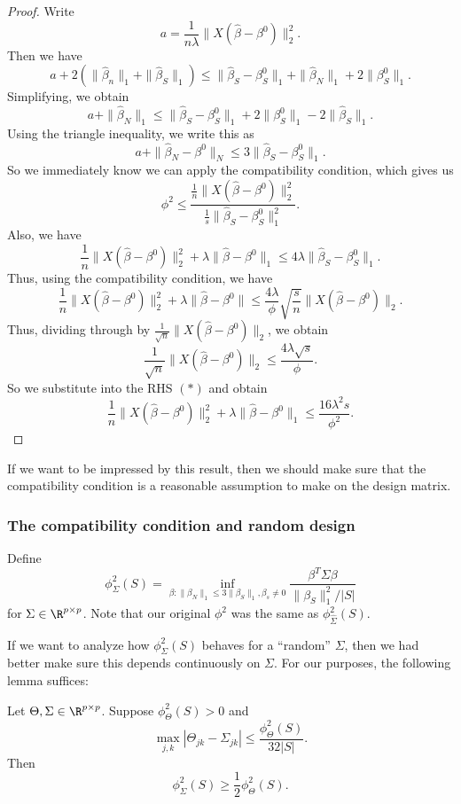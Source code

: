 \documentclass[a4paper]{article}
\begin{document}
\begin{proof}
  Write
  \[
    a = \frac{1}{n\lambda} \|X (\hat{\beta} - \beta^0)\|_2^2.
  \]
  Then we have
  \[
    a + 2 (\|\hat{\beta}_n\|_1 + \|\hat{\beta}_S\|_1) \leq \|\hat{\beta}_S - \beta^0_S \|_1 + \|\hat{\beta}_N\|_1 + 2 \|\beta^0_S\|_1.
  \]
  Simplifying, we obtain
  \[
    a + \|\hat{\beta}_N\|_1 \leq \|\hat{\beta}_S - \beta^0_S\|_1 + 2 \|\beta^0_S\|_1 - 2 \|\hat{\beta}_S\|_1.
  \]
  Using the triangle inequality, we write this as
  \[
    a + \|\hat{\beta}_N - \beta^0\|_N \leq 3 \|\hat{\beta}_S - \beta_S^0\|_1.
  \]
  So we immediately know we can apply the compatibility condition, which gives us
  \[
    \phi^2 \leq \frac{\frac{1}{n} \|X (\hat{\beta} - \beta^0)\|_2^2}{\frac{1}{s} \|\hat{\beta}_S - \beta^0_S\|_1^2}.
  \]
  Also, we have
  \[
    \frac{1}{n} \|X(\hat{\beta} -\beta^0)\|_2^2 + \lambda \|\hat{\beta} - \beta^0\|_1 \leq 4 \lambda\|\hat{\beta}_S - \beta^0_S\|_1.
  \]
  Thus, using the compatibility condition, we have
  \[
    \frac{1}{n} \|X (\hat{\beta} - \beta^0)\|^2_2 + \lambda \|\hat{\beta} - \beta^0\| \leq \frac{4 \lambda}{\phi} \sqrt{\frac{s}{n}} \|X (\hat{\beta} - \beta^0)\|_2.
  \]
  Thus, dividing through by $\frac{1}{\sqrt{n}} \|X(\hat{\beta} - \beta^0)\|_2$, we obtain
  \[
    \frac{1}{\sqrt{n}} \|X(\hat{\beta} - \beta^0)\|_2 \leq \frac{4 \lambda \sqrt{s}}{\phi}.\tag{$*$}
  \]
  So we substitute into the RHS $(*)$ and obtain
  \[
    \frac{1}{n} \|X (\hat{\beta} - \beta^0)\|_2^2 + \lambda \|\hat{\beta} - \beta^0\|_1 \leq \frac{16 \lambda^2 s}{\phi^2}.
  \]
\end{proof}
If we want to be impressed by this result, then we should make sure that the compatibility condition is a reasonable assumption to make on the design matrix.

\subsubsection*{The compatibility condition and random design}
Define
\[
  \phi_{\Sigma}^2(S) = \inf_{\beta: \|\beta_N\|_1 \leq 3 \|\beta_S\|_1, \beta_s \not= 0} \frac{\beta^T \Sigma \beta}{\|\beta_S\|_1^2/|S|}
\]
for $\Sigma \in \R^{p \times p}$. Note that our original $\phi^2$ was the same as $\phi^2_{\hat{\Sigma}}(S)$.

If we want to analyze how $\phi^2_{\Sigma}(S)$ behaves for a ``random'' $\Sigma$, then we had better make sure this depends continuously on $\Sigma$. For our purposes, the following lemma suffices:
\begin{lemma}
  Let $\Theta, \Sigma \in \R^{p \times p}$. Suppose $\phi^2_\Theta(S) > 0$ and
  \[
    \max_{j, k} |\Theta_{jk} - \Sigma_{jk}| \leq \frac{\phi^2_{\Theta}(S)}{32|S|}.
  \]
  Then
  \[
    \phi^2_\Sigma(S) \geq \frac{1}{2} \phi^2_\Theta(S).
  \]
\end{lemma}
\end{document}
